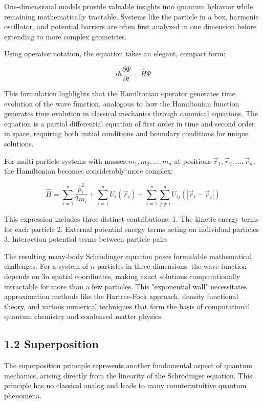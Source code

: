 \documentclass[10pt]{article}
\begin{document}
One-dimensional models provide valuable insights into quantum behavior while remaining mathematically tractable. Systems like the particle in a box, harmonic oscillator, and potential barriers are often first analyzed in one dimension before extending to more complex geometries.

Using operator notation, the equation takes an elegant, compact form:

\begin{equation*}
i \hbar \frac{\partial \Psi}{\partial t}=\hat{H} \Psi \tag{1.17}
\end{equation*}

This formulation highlights that the Hamiltonian operator generates time evolution of the wave function, analogous to how the Hamiltonian function generates time evolution in classical mechanics through canonical equations. The equation is a partial differential equation of first order in time and second order in space, requiring both initial conditions and boundary conditions for unique solutions.

For multi-particle systems with masses $m_{1}, m_{2}, \ldots, m_{n}$ at positions $\vec{r}_{1}, \vec{r}_{2}, \ldots, \vec{r}_{n}$, the Hamiltonian becomes considerably more complex:

\begin{equation*}
\hat{H}=\sum_{i=1}^{n} \frac{\hat{p}_i^{2}}{2 m_{i}}+\sum_{i=1}^{n} U_{i}\left(\vec{r}_{i}\right)+\sum_{i=1}^{n} \sum_{j \neq i}^{n} U_{i j}\left(\left|\vec{r}_{i}-\vec{r}_{j}\right|\right) \tag{1.18}
\end{equation*}

This expression includes three distinct contributions:
1. The kinetic energy terms for each particle
2. External potential energy terms acting on individual particles
3. Interaction potential terms between particle pairs

The resulting many-body Schrödinger equation poses formidable mathematical challenges. For a system of $n$ particles in three dimensions, the wave function depends on $3n$ spatial coordinates, making exact solutions computationally intractable for more than a few particles. This "exponential wall" necessitates approximation methods like the Hartree-Fock approach, density functional theory, and various numerical techniques that form the basis of computational quantum chemistry and condensed matter physics.

\subsection*{1.2 Superposition}
The superposition principle represents another fundamental aspect of quantum mechanics, arising directly from the linearity of the Schrödinger equation. This principle has no classical analog and leads to many counterintuitive quantum phenomena.
\end{document}
